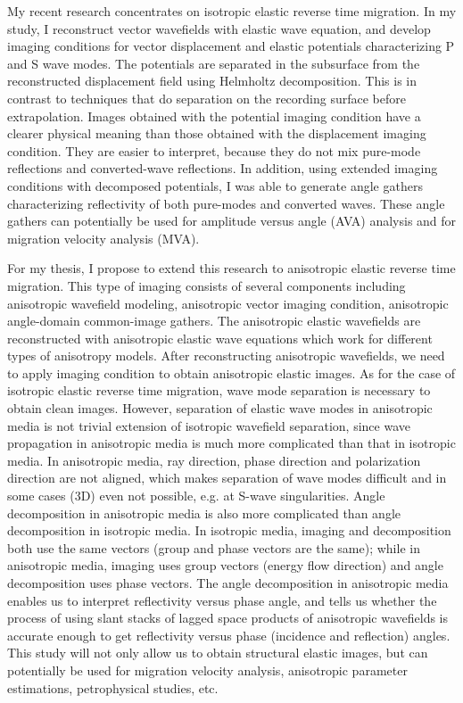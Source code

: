 
My recent research concentrates on isotropic elastic reverse time migration. In my study, I reconstruct vector wavefields with elastic wave equation, and develop imaging conditions for vector displacement and elastic potentials characterizing P and S wave modes. The potentials are separated in the subsurface from the reconstructed displacement field using Helmholtz decomposition. This is in contrast to techniques that do separation on the recording surface before extrapolation. Images obtained with the potential imaging condition have a clearer physical meaning than those obtained with the displacement imaging condition. They are easier to interpret, because they do not mix pure-mode reflections and converted-wave reflections. In addition, using extended imaging conditions with decomposed potentials, I was able to generate angle gathers characterizing reflectivity of both pure-modes and converted waves. These angle gathers can potentially be used for amplitude versus angle (AVA) analysis and for migration velocity analysis (MVA).

For my thesis, I propose to extend this research to anisotropic elastic reverse time migration. This type of imaging consists of several components including anisotropic wavefield modeling, anisotropic vector imaging condition, anisotropic angle-domain common-image gathers. 
The anisotropic elastic wavefields are reconstructed with anisotropic elastic wave equations which work for different types of anisotropy models. 
After reconstructing anisotropic wavefields, we need to apply imaging condition to obtain anisotropic elastic images. As for the case of isotropic elastic reverse time migration, wave mode separation is necessary to obtain clean images. 
However, separation of elastic wave modes in anisotropic media is not trivial extension of isotropic wavefield separation, since wave propagation in anisotropic media is much more complicated than that in isotropic media. In anisotropic media, ray direction, phase direction and polarization direction are not aligned, which makes separation of wave modes difficult and in some cases (3D) even not possible, e.g. at S-wave singularities.
Angle decomposition in anisotropic media is also more complicated than angle decomposition in isotropic media. 
In isotropic media, imaging and decomposition both use the same vectors (group and phase vectors are the same); while in anisotropic media, imaging uses group vectors (energy flow direction) and angle decomposition uses phase vectors.
The angle decomposition in anisotropic media enables us to interpret reflectivity versus phase angle, and tells us whether the process of using slant stacks of lagged space products of anisotropic wavefields is accurate enough to get reflectivity versus phase (incidence and reflection) angles.
This study will not only allow us to obtain structural elastic images, but can potentially be used for migration velocity analysis, anisotropic parameter estimations, petrophysical studies, etc. 




